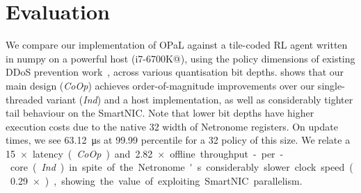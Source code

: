 \documentclass[
sigconf,natbib=false
,anonymous=true
]{acmart}
\newcommand{\approachshort}{OPaL}
\newcommand{\Coopfw}{\emph{CoOp}}
\newcommand{\coopfw}{\Coopfw}
\newcommand{\Indfw}{\emph{Ind}}
\newcommand{\indfw}{\Indfw}
\begin{document}
\section{Evaluation}
We compare our implementation of \approachshort{} against a tile-coded RL agent written in numpy on a powerful host (i7-6700K@), using the policy dimensions of existing DDoS prevention work~\parencite{DBLP:journals/tnsm/SimpsonRP20}, across various quantisation bit depths.
 shows that our main design (\coopfw) achieves order-of-magnitude improvements over our single-threaded variant (\indfw) and a host implementation, as well as considerably tighter tail behaviour on the SmartNIC.
Note that lower bit depths have higher execution costs due to the native \qty{32}{\bit} width of Netronome registers.
On update times, we see \qty{63.12}{\micro\second} at 99.99 percentile for a \qty{32}{\bit} policy of this size.
We relate a \qty{15}{$\times$} latency (\coopfw) and \qty{2.82}{$\times$} offline throughput-per-core (\indfw) in spite of the Netronome's considerably slower clock speed (\qty{0.29}{$\times$}), showing the value of exploiting SmartNIC parallelism.
\end{document}
